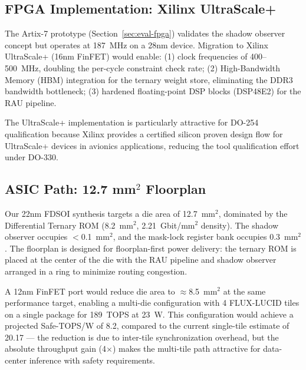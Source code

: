 \documentclass[sigplan,review,anonymous]{acmart}
\begin{document}
{%
\subsection{FPGA Implementation: Xilinx UltraScale+}
\label{sec:future-fpga}

The Artix-7 prototype (Section~\ref{sec:eval-fpga}) validates the
shadow observer concept but operates at 187~MHz on a 28nm device.
Migration to Xilinx UltraScale+ (16nm FinFET) would enable:
(1) clock frequencies of 400--500~MHz, doubling the per-cycle constraint
check rate;
(2) High-Bandwidth Memory (HBM) integration for the ternary weight store,
eliminating the DDR3 bandwidth bottleneck;
(3) hardened floating-point DSP blocks (DSP48E2) for the RAU pipeline.

The UltraScale+ implementation is particularly attractive for DO-254
qualification because Xilinx provides a certified silicon proven
design flow for UltraScale+ devices in avionics applications, reducing
the tool qualification effort under DO-330.

\subsection{ASIC Path: 12.7 mm$^2$ Floorplan}
\label{sec:future-asic}

Our 22nm FDSOI synthesis targets a die area of 12.7~mm$^2$, dominated
by the Differential Ternary ROM (8.2~mm$^2$, 2.21~Gbit/mm$^2$ density).
The shadow observer occupies $<$0.1~mm$^2$, and the mask-lock register
bank occupies 0.3~mm$^2$. The floorplan is designed for
floorplan-first power delivery: the ternary ROM is placed at the center
of the die with the RAU pipeline and shadow observer arranged in a
ring to minimize routing congestion.

A 12nm FinFET port would reduce die area to $\approx$8.5~mm$^2$
at the same performance target, enabling a multi-die configuration
with 4 FLUX-LUCID tiles on a single package for 189~TOPS at 23~W.
This configuration would achieve a projected Safe-TOPS/W of 8.2,
compared to the current single-tile estimate of 20.17 — the reduction
is due to inter-tile synchronization overhead, but the absolute
throughput gain (4$\times$) makes the multi-tile path attractive for
data-center inference with safety requirements.

}
\end{document}
